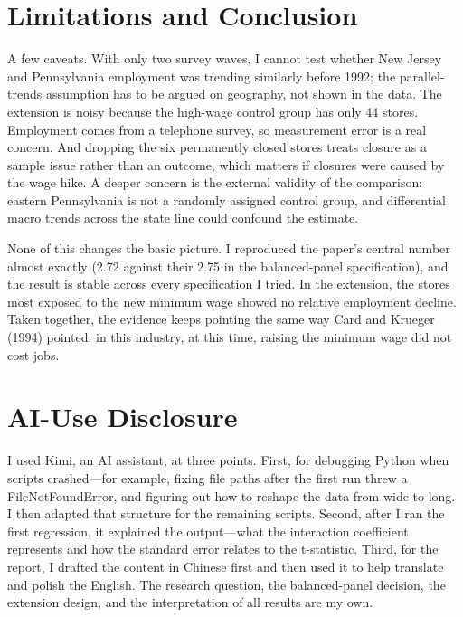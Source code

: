 \documentclass[11pt]{article}
\begin{document}
\section{Limitations and Conclusion}

A few caveats. With only two survey waves, I cannot test whether New Jersey and Pennsylvania employment was trending similarly before 1992; the parallel-trends assumption has to be argued on geography, not shown in the data. The extension is noisy because the high-wage control group has only 44 stores. Employment comes from a telephone survey, so measurement error is a real concern. And dropping the six permanently closed stores treats closure as a sample issue rather than an outcome, which matters if closures were caused by the wage hike. A deeper concern is the external validity of the comparison: eastern Pennsylvania is not a randomly assigned control group, and differential macro trends across the state line could confound the estimate.

None of this changes the basic picture. I reproduced the paper's central number almost exactly (2.72 against their 2.75 in the balanced-panel specification), and the result is stable across every specification I tried. In the extension, the stores most exposed to the new minimum wage showed no relative employment decline. Taken together, the evidence keeps pointing the same way Card and Krueger (1994) pointed: in this industry, at this time, raising the minimum wage did not cost jobs.

\section{AI-Use Disclosure}

I used Kimi, an AI assistant, at three points. First, for debugging Python when scripts crashed---for example, fixing file paths after the first run threw a FileNotFoundError, and figuring out how to reshape the data from wide to long. I then adapted that structure for the remaining scripts. Second, after I ran the first regression, it explained the output---what the interaction coefficient represents and how the standard error relates to the t-statistic. Third, for the report, I drafted the content in Chinese first and then used it to help translate and polish the English. The research question, the balanced-panel decision, the extension design, and the interpretation of all results are my own.
\end{document}
